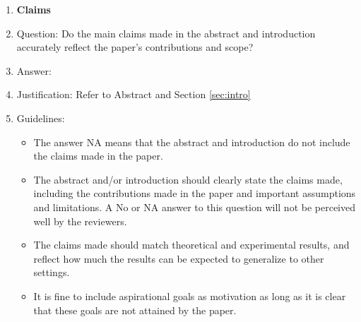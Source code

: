 \documentclass{article}
\begin{document}
\begin{enumerate}

\item {\bf Claims}
    \item[] Question: Do the main claims made in the abstract and introduction accurately reflect the paper's contributions and scope?
    \item[] Answer: \answerYes{} %
    \item[] Justification: Refer to Abstract and Section \ref{sec:intro}
    \item[] Guidelines:
    \begin{itemize}
        \item The answer NA means that the abstract and introduction do not include the claims made in the paper.
        \item The abstract and/or introduction should clearly state the claims made, including the contributions made in the paper and important assumptions and limitations. A No or NA answer to this question will not be perceived well by the reviewers. 
        \item The claims made should match theoretical and experimental results, and reflect how much the results can be expected to generalize to other settings. 
        \item It is fine to include aspirational goals as motivation as long as it is clear that these goals are not attained by the paper. 
    \end{itemize}


\end{enumerate}
\end{document}
